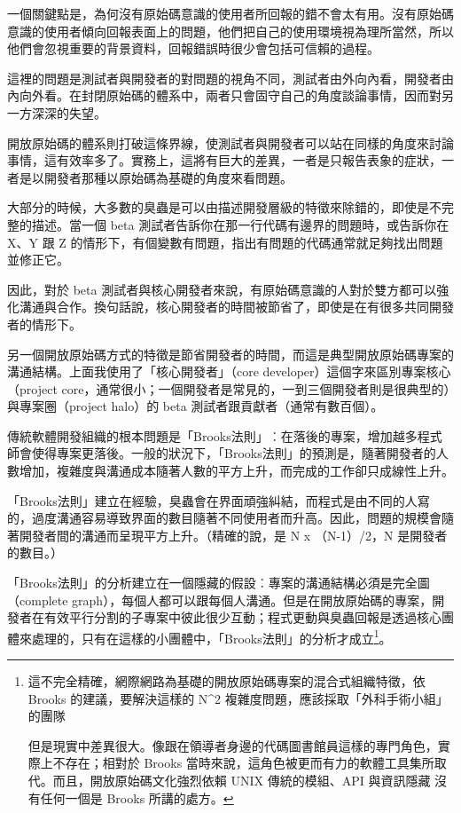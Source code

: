 \documentclass[10pt, b5paper]{book}
\makeatletter
\newcommand*{\shifttext}[2]{%
  \settowidth{\@tempdima}{#2}%
  \makebox[\@tempdima]{\hspace*{#1}#2}%
}
\makeatother
\begin{document}
一個關鍵點是，為何沒有原始碼意識的使用者所回報的錯不會太有用。沒有原始碼意識的使用者傾向回報表面上的問題，他們把自己的使用環境視為理所當然，所以他們會忽視重要的背景資料，回報錯誤時很少會包括可信賴的過程。

這裡的問題是測試者與開發者的對問題的視角不同，測試者由外向內看，開發者由內向外看。在封閉原始碼的體系中，兩者只會固守自己的角度談論事情，因而對另一方深深的失望。

開放原始碼的體系則打破這條界線，使測試者與開發者可以站在同樣的角度來討論事情，這有效率多了。實務上，這將有巨大的差異，一者是只報告表象的症狀，一者是以開發者那種以原始碼為基礎的角度來看問題。

大部分的時候，大多數的臭蟲是可以由描述開發層級的特徵來除錯的，即使是不完整的描述。當一個
beta 測試者告訴你在那一行代碼有邊界的問題時，或告訴你在 X、Y 跟 Z
的情形下，有個變數有問題，指出有問題的代碼通常就足夠找出問題並修正它。

因此，對於 beta
測試者與核心開發者來說，有原始碼意識的人對於雙方都可以強化溝通與合作。換句話說，核心開發者的時間被節省了，即使是在有很多共同開發者的情形下。

另一個開放原始碼方式的特徵是節省開發者的時間，而這是典型開放原始碼專案的溝通結構。上面我使用了「核心開發者」（core
developer）這個字來區別專案核心（project
core，通常很小；一個開發者是常見的，一到三個開發者則是很典型的）與專案圈（project
halo）的 beta 測試者跟貢獻者（通常有數百個）。

傳統軟體開發組織的根本問題是「Brooks法則」︰在落後的專案，增加越多程式師會使得專案更落後。一般的狀況下，「Brooks法則」的預測是，隨著開發者的人數增加，複雜度與溝通成本隨著人數的平方上升，而完成的工作卻只成線性上升。

「Brooks法則」建立在經驗，臭蟲會在界面頑強糾結，而程式是由不同的人寫的，過度溝通容易導致界面的數目隨著不同使用者而升高。因此，問題的規模會隨著開發者間的溝通而呈現平方上升。（精確的說，是
N x （N-1）/2，N 是開發者的數目。）

「Brooks法則」的分析建立在一個隱藏的假設︰專案的溝通結構必須是完全圖（complete
graph），每個人都可以跟每個人溝通。但是在開放原始碼的專案，開發者在有效平行分割的子專案中彼此很少互動；程式更動與臭蟲回報是透過核心團體來處理的，只有在這樣的小團體中，「Brooks法則」的分析才成立\footnote{這不完全精確，網際網路為基礎的開放原始碼專案的混合式組織特徵，依
  Brooks 的建議，要解決這樣的 N\^{}2
  複雜度問題，應該採取「外科手術小組」的團隊 \shifttext{1pt}{---}\shifttext{-1pt}{---}
  但是現實中差異很大。像跟在領導者身邊的代碼圖書館員這樣的專門角色，實際上不存在；相對於
  Brooks
  當時來說，這角色被更而有力的軟體工具集所取代。而且，開放原始碼文化強烈依賴
  UNIX 傳統的模組、API 與資訊隱藏 \shifttext{1pt}{---}\shifttext{-1pt}{---} 沒有任何一個是 Brooks
  所講的處方。}。
\end{document}
